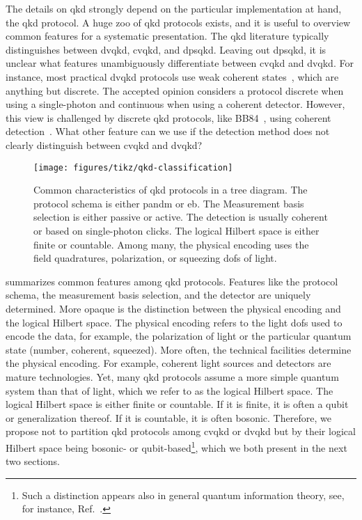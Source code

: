The details on \gls{qkd} strongly depend on the particular implementation at hand, the \gls{qkd} protocol.
A huge zoo of \gls{qkd} protocols exists, and it is useful to overview common features for a systematic presentation.
The \gls{qkd} literature typically distinguishes between \gls{dvqkd}, \gls{cvqkd}, and \gls{dpsqkd}.
Leaving out \gls{dpsqkd}, it is unclear what features unambiguously differentiate between \gls{cvqkd} and \gls{dvqkd}.
For instance, most practical \gls{dvqkd} protocols use weak coherent states~\cite{Duvsek2006}, which are anything but discrete.
The accepted opinion considers a protocol discrete when using a single-photon and continuous when using a coherent detector.
However, this view is challenged by discrete \gls{qkd} protocols, like BB84~\cite{Bennett1984}, using coherent detection~\cite{Qi2021}.
What other feature can we use if the detection method does not clearly distinguish between \gls{cvqkd} and \gls{dvqkd}?
\begin{figure}[htb]
	\centering
	\texttt{[image: figures/tikz/qkd-classification]}
	\caption{Common characteristics of \gls{qkd} protocols in a tree diagram. The protocol schema is either \gls{pandm} or \gls{eb}. The Measurement basis selection is either passive or active. The detection is usually coherent or based on single-photon clicks. The logical Hilbert space is either finite or countable. Among many, the physical encoding uses the field quadratures, polarization, or squeezing \gls{dof}s of light.}\label{fig:qkd_classification}
\end{figure}
 summarizes common features among \gls{qkd} protocols.
Features like the protocol schema, the measurement basis selection, and the detector are uniquely determined.
More opaque is the distinction between the physical encoding and the logical Hilbert space.
The physical encoding refers to the light \gls{dof}s used to encode the data, for example, the polarization of light or the particular quantum state (number, coherent, squeezed).
More often, the technical facilities determine the physical encoding.
For example, coherent light sources and detectors are mature technologies.
Yet, many \gls{qkd} protocols assume a more simple quantum system than that of light, which we refer to as the logical Hilbert space.
The logical Hilbert space is either finite or countable.
If it is finite, it is often a qubit or generalization thereof.
If it is countable, it is often bosonic.
Therefore, we propose not to partition \gls{qkd} protocols among \gls{cvqkd} or \gls{dvqkd} but by their logical Hilbert space being bosonic- or qubit-based\footnote{Such a distinction appears also in general quantum information theory, see, for instance, Ref.~\cite[p.~2]{Weedbrook2012}.}, which we both present in the next two sections.